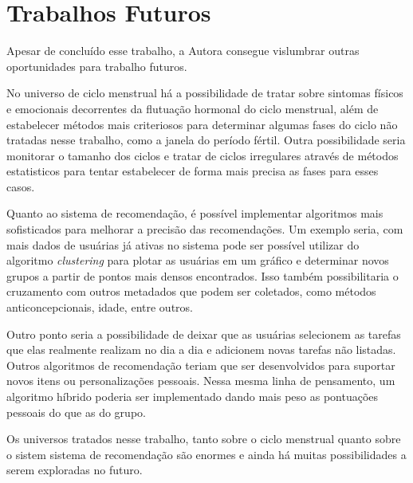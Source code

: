\section{Trabalhos Futuros}

Apesar de concluído esse trabalho, a Autora consegue vislumbrar outras oportunidades para trabalho futuros.

No universo de ciclo menstrual há a possibilidade de tratar sobre sintomas físicos e emocionais decorrentes 
da flutuação hormonal do ciclo menstrual, além de estabelecer métodos mais criteriosos para determinar 
algumas fases do ciclo não tratadas nesse trabalho, como a janela do período fértil. Outra possibilidade seria 
monitorar o tamanho dos ciclos e tratar de ciclos irregulares através de métodos estatisticos para 
tentar estabelecer de forma mais precisa as fases para esses casos.

Quanto ao sistema de recomendação, é possível implementar algoritmos mais sofisticados para melhorar 
a precisão das recomendações. Um exemplo seria, com mais dados de usuárias já ativas no sistema pode 
ser possível utilizar do algoritmo \emph{clustering} para plotar as usuárias em um gráfico e determinar 
novos grupos a partir de pontos mais densos encontrados. Isso também possibilitaria o cruzamento com outros 
metadados que podem ser coletados, como métodos anticoncepcionais, idade, entre outros.

Outro ponto seria a possibilidade de deixar que as usuárias selecionem as tarefas que elas realmente 
realizam no dia a dia e adicionem novas tarefas não listadas. Outros algoritmos de recomendação teriam 
que ser desenvolvidos para suportar novos itens ou personalizações pessoais. Nessa mesma linha de pensamento, 
um algoritmo híbrido poderia ser implementado dando mais peso as pontuações pessoais do que as do grupo.

Os universos tratados nesse trabalho, tanto sobre o ciclo menstrual quanto sobre o sistem sistema de 
recomendação são enormes e ainda há muitas possibilidades a serem exploradas no futuro. 
